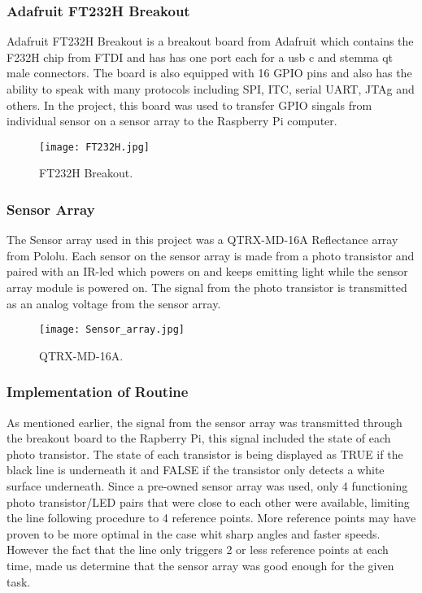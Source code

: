 \subsubsection{Adafruit FT232H Breakout}
Adafruit FT232H Breakout is a breakout board from Adafruit which contains the F232H chip from FTDI and has has one port each for a usb c and stemma qt male connectors. The board is also equipped with 16 GPIO pins and also has the ability to speak with many protocols including SPI, ITC, serial UART, JTAg and others. In the project, this board was used to transfer GPIO singals from individual sensor on a sensor array to the Raspberry Pi computer. 
\begin{figure}[H]
    \centering
    \texttt{[image: FT232H.jpg]}
    \caption{FT232H Breakout.}
    \label{FT232H}
\end{figure}

\subsubsection{Sensor Array}
The Sensor array used in this project was a QTRX-MD-16A Reflectance array from Pololu. Each sensor on the sensor array is made from a photo transistor and paired with an IR-led which powers on and keeps emitting light while the sensor array module is powered on. The signal from the photo transistor is transmitted as an analog voltage from the sensor array. 
\begin{figure}[H]
    \centering
    \texttt{[image: Sensor\_array.jpg]}
    \caption{QTRX-MD-16A.}
    \label{Sensor_array}
\end{figure}
\subsubsection{Implementation of Routine}
As mentioned earlier, the signal from the sensor array was transmitted through the breakout board to the Rapberry Pi, this signal included the state of each photo transistor. The state of each transistor is being displayed as TRUE if the black line is underneath it and FALSE if the transistor only detects a white surface underneath. Since a pre-owned sensor array was used, only 4 functioning photo transistor/LED pairs that were close to each other were available, limiting the line following procedure to 4 reference points. More reference points may have proven to be more optimal in the case whit sharp angles and faster speeds. However the fact that the line only triggers 2 or less reference points at each time, made us determine that the sensor array was good enough for the given task.  \newline

